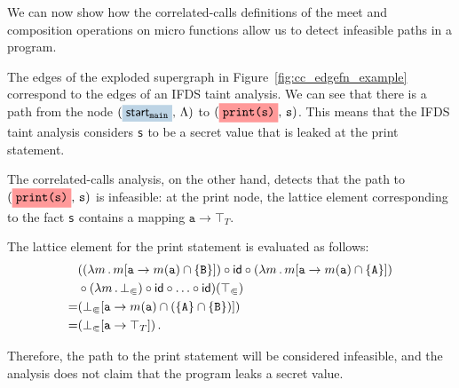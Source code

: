 We can now show how the correlated-calls definitions of the meet and composition operations on micro functions allow us to detect infeasible paths in a program.
\begin{example}\label{ex:cc}
  The edges of the exploded supergraph in Figure~\ref{fig:cc_edgefn_example} correspond to the edges of an IFDS taint analysis. We can see that there is a path from the node $(\highlight{\startmain}{greyblue},\,\Lambda)$ to $(\highlight{\texttt{print(s)}}{lightsalmonpink},\,\texttt s)$. This means that the IFDS taint analysis considers \texttt s to be a secret value that is leaked at the print statement.
  
  The correlated-calls analysis, on the other hand, detects that the path to $(\highlight{\texttt{print(s)}}{lightsalmonpink},\,\texttt s)$ is infeasible: at the print node, the lattice element corresponding to the fact \verb's' contains a mapping $\texttt a\to\top_T$.
  
  The lattice element for the print statement is evaluated as follows:
  \begin{align*}
    &((\lambda m\,.\,m[\texttt a\to m(\texttt a)\cap\{\texttt B\}])\circ
    \textsf{id}\circ
    (\lambda m\,.\,m[\texttt a\to m(\texttt a)\cap\{\texttt A\}])\\
    &\circ
    (\lambda m\,.\,\bot_\Subset)\circ
    \textsf{id}\circ\ldots\circ\textsf{id})(\top_\Subset)
    \\
    =&(\bot_\Subset[\texttt a\to m(\texttt a)\cap(\{\texttt A\}\cap\{\texttt B\})])
    \\
    =&(\bot_\Subset[\texttt a\to\top_T])\,.
  \end{align*}
  
  Therefore, the path to the print statement will be considered infeasible, and the analysis does not claim that the program leaks a secret value.
\end{example}

